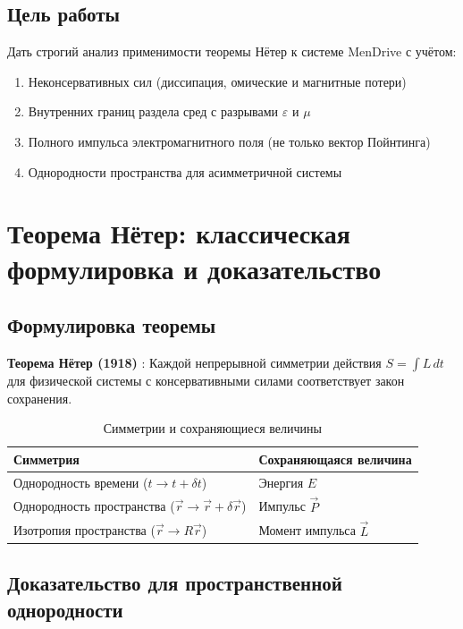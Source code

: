 \documentclass[a4paper,12pt]{article}
\begin{document}
\subsection{Цель работы}

Дать строгий анализ применимости теоремы Нётер к системе MenDrive с учётом:
\begin{enumerate}
    \item Неконсервативных сил (диссипация, омические и магнитные потери)
    \item Внутренних границ раздела сред с разрывами $\varepsilon$ и $\mu$
    \item Полного импульса электромагнитного поля (не только вектор Пойнтинга)
    \item Однородности пространства для асимметричной системы
\end{enumerate}

\section{Теорема Нётер: классическая формулировка и доказательство}

\subsection{Формулировка теоремы}

\textbf{Теорема Нётер (1918)} \cite{Noether1918}: Каждой непрерывной
симметрии действия $S = \int L\,dt$ для физической системы с консервативными
силами соответствует закон сохранения.

\begin{table}[h]
\centering
\caption{Симметрии и сохраняющиеся величины}
\label{tab:noether_symmetries}
\begin{tabular}{@{}ll@{}}
\toprule
\textbf{Симметрия} & \textbf{Сохраняющаяся величина} \\
\midrule
Однородность времени ($t \to t + \delta t$) & Энергия $E$ \\
Однородность пространства ($\vec{r} \to \vec{r} + \delta\vec{r}$) & Импульс $\vec{P}$ \\
Изотропия пространства ($\vec{r} \to R\vec{r}$) & Момент импульса $\vec{L}$ \\
\bottomrule
\end{tabular}
\end{table}

\subsection{Доказательство для пространственной однородности}
\end{document}
